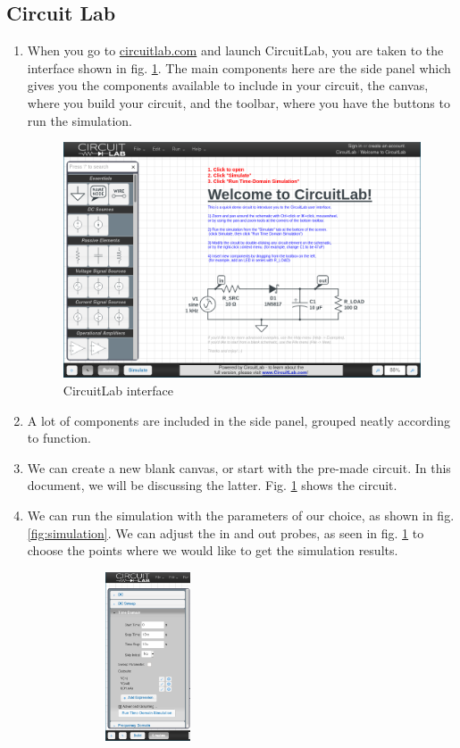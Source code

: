 \documentclass{article}
\begin{document}
\subsection{Circuit Lab}
\begin{enumerate}
	\item When you go to \href{https://www.circuitlab.com}{circuitlab.com} and launch CircuitLab, you are taken to the interface shown in fig. \ref{fig:circuitlab}. The main components here are the side panel which gives you the components available to include in your circuit, the canvas, where you build your circuit, and the toolbar, where you have the buttons to run the simulation.
	\begin{figure}[h]
		\centering
		\includegraphics[width=0.7\linewidth]{circuitlab}
		\caption[CircuitLab interface]{CircuitLab interface}
		\label{fig:circuitlab}
	\end{figure}
	\item A lot of components are included in the side panel, grouped neatly according to function.
	\item We can create a new blank canvas, or start with the pre-made circuit. In this document, we will be discussing the latter. Fig. \ref{fig:circuitlab} shows the circuit.
	\item We can run the simulation with the parameters of our choice, as shown in fig. \ref{fig:simulation}. We can adjust the in and out probes, as seen in fig. \ref{fig:circuitlab} to choose the points where we would like to get the simulation results.
	\begin{figure}[h]
		\centering
		\includegraphics[width=5cm,height=5cm,keepaspectratio]{simulation}

\end{figure}
\end{enumerate}
\end{document}
